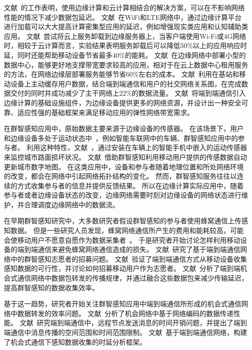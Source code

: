 文献~\cite{DBLP:conf/infocom/RimalVM16}的工作表明，使用边缘计算和云计算相结合的解决方案，可以在不影响网络性能的情况下减少数据包延迟。
文献~\cite{DBLP:conf/apsys/HuGHWACPS16}在WiFi和LTE网络中，通过边缘计算平台进行加载可以大大提高计算密集型应用的延迟，例如增强现实类应用和认知辅助类应用。
文献~\cite{gao2015cloudlets}尝试将云上服务卸载到边缘服务器上，当客户端使用Wi-Fi或4G网络时，相较于云计算而言，实验结果表明服务卸载后可以降低50\%以上的应用响应时延，同时还能帮助移动设备节省最多40\%的能耗。
文献~\cite{DBLP:conf/saso/MehtaTKTKE16}在边缘网络中部署小型的数据中心，能够更好地支撑带宽要求较高的应用，相对于在云上数据中心租用服务的方法，在网络边缘层部署服务能够节省60\%左右的成本。
文献~\cite{DBLP:journals/cm/BastugBD14}利用在基站和移动设备上主动缓存用户数据，结合端到端通信和用户的社交网络关系图，在完成数据交付的同时并成功减少了主干网络上22\%的数据流量。
文献~\cite{DBLP:conf/mwcn/OrsiniBL15}将端到端通信引入边缘计算的基础设施组件，为边缘设备提供更多的网络资源，并设计出一种安全可靠、适应性强的基础框架来满足移动应用的弹性网络带宽需求。

在群智感知应用中，原始数据主要来源于边缘设备的传感器。
在该场景下，用户和边缘设备多处于运动状态中~\cite{DBLP:journals/jsac/LyuNTLWGP17}，例如智能车联网中的车辆、群智感知应用中的参与者。
利用这种特性，文献~\cite{DBLP:conf/itsc/PiaoA17}，通过安装在车辆上的智能手机中嵌入的运动传感器来监控城市路面损坏状况。
文献~\cite{DBLP:journals/tase/PengGXGY18}借助群智感知利用移动用户提供的传感数据自动更新城市数字地图。
在这类应用中，设备和参与者随着地理位置和所处网络环境的改变，都会在网络中引起网络拓扑结构的变化。
然而，群智感知服务往往以连续的方式收集参与者的信息并提供反馈结果。
所以在边缘计算实际应用中，随着参与者或者边缘设备状态的改变，边缘网络需要时刻对边缘设备的网络状态进行维护，并合理调度边缘网络中的数据流。

在早期群智感知研究中，大多数研究者假设群智感知的参与者使用蜂窝通信上传感知数据。
但是一些研究人员发现，蜂窝网络通信所产生的费用和能耗较高，可能会使移动用户不愿意自愿作为数据采集者~\cite{DBLP:conf/globecom/ZhangJLLC16,DBLP:conf/icdcs/XiaoWHHH16}。
于是研究者开始讨论怎样利用移动设备的端到端通信来避免蜂窝网络通信造成的损失。
文献~\cite{DBLP:conf/infocom/KaraliopoulosTK15}研究了基于端到端通信网络中的群智感知志愿者的招募问题。
文献~\cite{DBLP:journals/puc/WangLL17}验证了端到端通信方式从移动设备收集感知数据的可行性，并讨论如何招募移动用户作为志愿者。 
文献~\cite{DBLP:journals/tpds/ZhaoMTL15}分析了端到端机会式通信网络中数据包转发的传播规律，并通过融合这些数据包来减少传输延迟，提高群智感知的数据收集效率。

基于这一趋势，研究者开始关注群智感知应用中端到端通信所形成的机会式通信网络中数据转发的效率问题。
文献~\cite{DBLP:conf/wcnc/QinF13}分析了机会网络中基于网络编码的数据传递性能。
文献~\cite{DBLP:journals/twc/LiW14}研究端到端通信中，远程节点发送消息的时间开销问题，并提出了端到端通信中消息传播的空间范围和时间范围限制。
文献~\cite{DBLP:journals/winet/ZhaoMLT18}基于端到端通信网络，构建了机会式通信下感知数据收集的时延分析框架。

